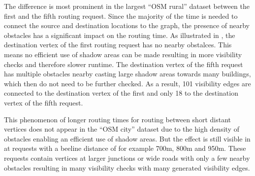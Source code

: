 			The difference is most prominent in the largest \enquote{OSM rural} dataset between the first and the fifth routing request.
			Since the majority of the time is needed to connect the source and destination locations to the graph, the presence of nearby obstacles has a significant impact on the routing time.
			As illustrated in , the destination vertex of the first routing request has no nearby obstalces.
			This means no efficient use of shadow areas can be made resulting in more visibility checks and therefore slower runtime.
			The destination vertex of the fifth request has multiple obstacles nearby casting large shadow areas towards many buildings, which then do not need to be further checked.
			As a result, 101 visibility edges are connected to the destination vertex of the first and only 18 to the destination vertex of the fifth request.
			
			This phenomenon of longer routing times for routing between short distant vertices does not appear in the \enquote{OSM city} dataset due to the high density of obstacles enabling an efficient use of shadow areas.
			But the effect is still visible in  at requests with a beeline distance of for example 700m, 800m and 950m.
			These requests contain vertices at larger junctions or wide roads with only a few nearby obstacles resulting in many visibility checks with many generated visibility edges.
			
